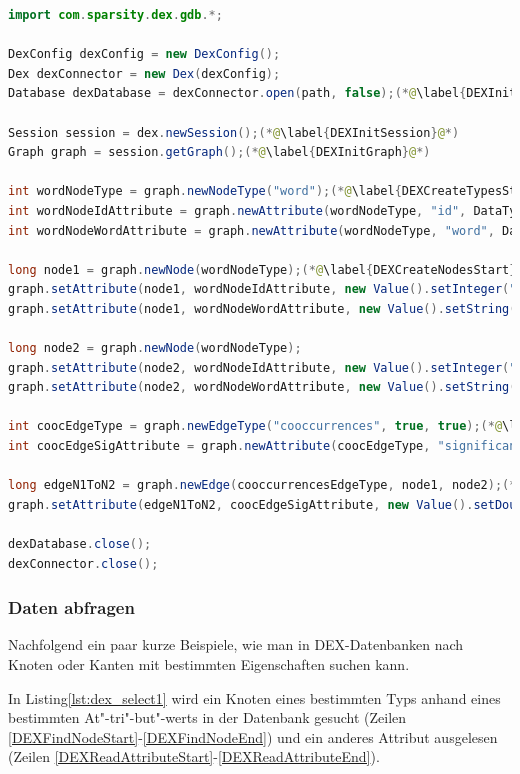 \documentclass[11pt, a4paper, oneside]{article} %
\begin{document}
\begin{lstlisting}[caption={DEX - Daten einfügen},label={lst:dex_insert},language=Java]
import com.sparsity.dex.gdb.*;

DexConfig dexConfig = new DexConfig();
Dex dexConnector = new Dex(dexConfig);
Database dexDatabase = dexConnector.open(path, false);(*@\label{DEXInitConnection}@*)

Session session = dex.newSession();(*@\label{DEXInitSession}@*)
Graph graph = session.getGraph();(*@\label{DEXInitGraph}@*)

int wordNodeType = graph.newNodeType("word");(*@\label{DEXCreateTypesStart}@*)
int wordNodeIdAttribute = graph.newAttribute(wordNodeType, "id", DataType.Integer, AttributeKind.Indexed);
int wordNodeWordAttribute = graph.newAttribute(wordNodeType, "word", DataType.String, AttributeKind.Basic);(*@\label{DEXCreateTypesEnd}@*)

long node1 = graph.newNode(wordNodeType);(*@\label{DEXCreateNodesStart}@*)
graph.setAttribute(node1, wordNodeIdAttribute, new Value().setInteger("1"));
graph.setAttribute(node1, wordNodeWordAttribute, new Value().setString("Car"));

long node2 = graph.newNode(wordNodeType);
graph.setAttribute(node2, wordNodeIdAttribute, new Value().setInteger("2"));
graph.setAttribute(node2, wordNodeWordAttribute, new Value().setString("Tree"));(*@\label{DEXCreateNodesEnd}@*)

int coocEdgeType = graph.newEdgeType("cooccurrences", true, true);(*@\label{DEXCreateEdgeTypesStart}@*)
int coocEdgeSigAttribute = graph.newAttribute(coocEdgeType, "significance", DataType.Double, AttributeKind.Indexed);(*@\label{DEXCreateEdgeTypesEnd}@*)

long edgeN1ToN2 = graph.newEdge(cooccurrencesEdgeType, node1, node2);(*@\label{DEXCreateEdgeStart}@*)
graph.setAttribute(edgeN1ToN2, coocEdgeSigAttribute, new Value().setDouble(1.5));(*@\label{DEXCreateEdgeEnd}@*)

dexDatabase.close();
dexConnector.close();
\end{lstlisting}

\subsubsection{Daten abfragen}

Nachfolgend ein paar kurze Beispiele, wie man in DEX-Datenbanken nach Knoten oder Kanten mit bestimmten Eigenschaften suchen kann.

In Listing\ref{lst:dex_select1} wird ein Knoten eines bestimmten Typs anhand eines bestimmten At"-tri"-but"-werts in der Datenbank gesucht (Zeilen \ref{DEXFindNodeStart}-\ref{DEXFindNodeEnd}) und ein anderes Attribut ausgelesen (Zeilen \ref{DEXReadAttributeStart}-\ref{DEXReadAttributeEnd}).
\end{document}

